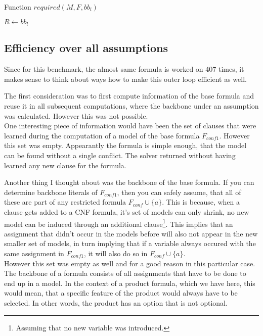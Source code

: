 \begin{algorithm}
\caption{{\sc Function $required(M,F,bb_l)$ }}
\label{alg:specReq}
\DontPrintSemicolon
{}
$R \gets bb_l$\;
\;

\end{algorithm}




\subsection{Efficiency over all assumptions}
Since for this benchmark, the almost same formula is worked on 407 times, it makes sense to think about ways how to make this outer loop efficient as well.

The first consideration was to first compute information of the base formula and reuse it in all subsequent computations, where the backbone under an assumption was calculated. However this was not possible.\\
One interesting piece of information would have been the set of clauses that were learned during the computation of a model of the base formula $F_{conf1}$. However this set was empty. Appearantly the formula is simple enough, that the model can be found without a single conflict. The solver returned without having learned any new clause for the formula.

Another thing I thought about was the backbone of the base formula. If you can determine backbone literals of $F_{conf1}$, then you can safely assume, that all of these are part of any restricted formula $F_{conf} \cup \{a\}$. This is because, when a clause gets added to a CNF formula, it's set of models can only shrink, no new model can be induced through an additional clause\footnote{Assuming that no new variable was introduced.}. This implies that an assignment that didn't occur in the models before will also not appear in the new smaller set of models, in turn implying that if a variable always occured with the same assignment in $F_{conf1}$, it will also do so in $F_{conf} \cup \{a\}$. \\
However this set was empty as well and for a good reason in this particular case. The backbone of a formula consists of all assignments that have to be done to end up in a model. In the context of a product formula, which we have here, this would mean, that a specific feature of the product would always have to be selected. In other words, the product has an option that is not optional. 

